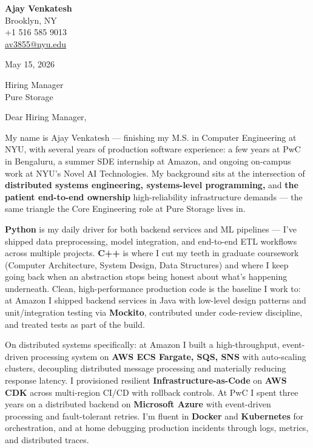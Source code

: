 \documentclass[letterpaper,11pt]{article}
\begin{document}
\begin{flushleft}
\textbf{\large Ajay Venkatesh} \\
Brooklyn, NY \\
+1 516 585 9013 \\
\href{mailto:av3855@nyu.edu}{av3855@nyu.edu}
\end{flushleft}

\vspace{10pt}

May 15, 2026

\vspace{6pt}

Hiring Manager \\
Pure Storage

\vspace{10pt}

Dear Hiring Manager,

My name is Ajay Venkatesh --- finishing my M.S. in Computer Engineering at NYU, with several years of production software experience: a few years at PwC in Bengaluru, a summer SDE internship at Amazon, and ongoing on-campus work at NYU's Novel AI Technologies. My background sits at the intersection of \textbf{distributed systems engineering, systems-level programming,} and \textbf{the patient end-to-end ownership} high-reliability infrastructure demands --- the same triangle the Core Engineering role at Pure Storage lives in.

\textbf{Python} is my daily driver for both backend services and ML pipelines --- I've shipped data preprocessing, model integration, and end-to-end ETL workflows across multiple projects. \textbf{C++} is where I cut my teeth in graduate coursework (Computer Architecture, System Design, Data Structures) and where I keep going back when an abstraction stops being honest about what's happening underneath. Clean, high-performance production code is the baseline I work to: at Amazon I shipped backend services in Java with low-level design patterns and unit/integration testing via \textbf{Mockito}, contributed under code-review discipline, and treated tests as part of the build.

On distributed systems specifically: at Amazon I built a high-throughput, event-driven processing system on \textbf{AWS ECS Fargate, SQS, SNS} with auto-scaling clusters, decoupling distributed message processing and materially reducing response latency. I provisioned resilient \textbf{Infrastructure-as-Code} on \textbf{AWS CDK} across multi-region CI/CD with rollback controls. At PwC I spent three years on a distributed backend on \textbf{Microsoft Azure} with event-driven processing and fault-tolerant retries. I'm fluent in \textbf{Docker} and \textbf{Kubernetes} for orchestration, and at home debugging production incidents through logs, metrics, and distributed traces.
\end{document}
